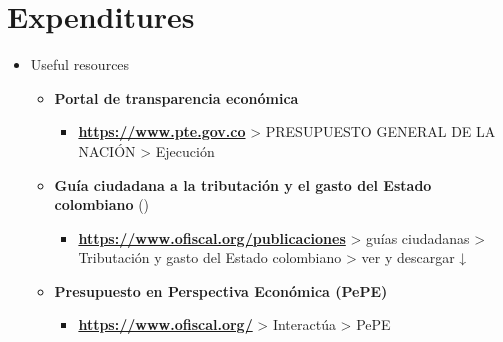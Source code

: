 \documentclass[
  ignorenonframetext,
]{beamer}
\providecommand{\tightlist}{%
  \setlength{\itemsep}{0pt}\setlength{\parskip}{0pt}}\usepackage{longtable,booktabs,array}
\begin{document}
\section{Expenditures}\label{expenditures}

\begin{frame}{}
\label{section-20}
\begin{itemize}
\item
  Useful resources

  \begin{itemize}
  \item
    \textbf{Portal de transparencia económica}

    \begin{itemize}
    \tightlist
    \item
      \href{https://www.pte.gov.co}{\textbf{https://www.pte.gov.co}}
      \textgreater{} PRESUPUESTO GENERAL DE LA NACIÓN \textgreater{}
      Ejecución
    \end{itemize}
  \item
    \textbf{Guía ciudadana a la tributación y el gasto del Estado
    colombiano}
    ()

    \begin{itemize}
    \tightlist
    \item
      \href{https://www.ofiscal.org/publicaciones}{\textbf{https://www.ofiscal.org/publicaciones}}
      \textgreater{} guías ciudadanas \textgreater{} Tributación y gasto
      del Estado colombiano \textgreater{} ver y descargar ↓
    \end{itemize}
  \item
    \textbf{Presupuesto en Perspectiva Económica (PePE)}

    \begin{itemize}
    \tightlist
    \item
      \href{https://www.ofiscal.org/}{\textbf{https://www.ofiscal.org/}}
      \textgreater{} Interactúa \textgreater{} PePE
    \end{itemize}
  \end{itemize}
\end{itemize}
\end{frame}
\end{document}
